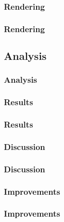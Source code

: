 \subsubsection{Rendering}
\begin{frame}
\frametitle{Rendering}
\end{frame}


\subsection{Analysis}
\begin{frame}
\frametitle{Analysis}
\end{frame}

\subsubsection{Results}
\begin{frame}
\frametitle{Results}
\end{frame}

\subsubsection{Discussion}
\begin{frame}
\frametitle{Discussion}
\end{frame}

\subsubsection{Improvements}
\begin{frame}
\frametitle{Improvements}
\end{frame}

\begin{frame}
\frametitle{}
\end{frame}

